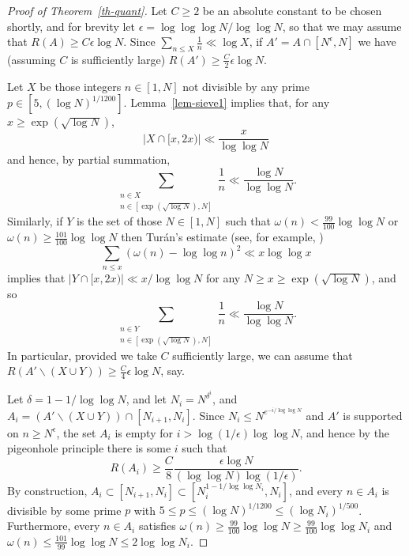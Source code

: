 \documentclass[12pt]{amsart}
\newcommand{\abs}[1]{\left\lvert #1\right\rvert}
\begin{document}
\begin{proof}[Proof of Theorem~\ref{th-quant}]
Let $C\geq 2$ be an absolute constant to be chosen shortly, and for brevity let $\epsilon = \log\log\log N/\log\log N$, so that we may assume that $R(A)\geq C\epsilon \log N$. Since $\sum_{n\leq X}\frac{1}{n}\ll \log X$, if $A'=A\cap [N^\epsilon,N]$ we have (assuming $C$ is sufficiently large) $R(A')\geq \frac{C}{2}\epsilon\log N$. 

Let $X$ be those integers $n\in [1,N]$ not divisible by any prime $p\in [5,(\log N)^{1/1200}]$. Lemma~\ref{lem-sieve1} implies that, for any $x\geq \exp(\sqrt{\log N})$,  
\[\abs{X\cap[x,2x)}\ll \frac{x}{\log\log N}\]
and hence, by partial summation, 
\[\sum_{\substack{n\in X\\ n\in [\exp(\sqrt{\log N}),N]}}\frac{1}{n}\ll \frac{\log N}{\log\log N}.\]
Similarly, if $Y$ is the set of those $N\in [1,N]$ such that $\omega(n) <\frac{99}{100}\log\log N$ or $\omega(n)\geq \frac{101}{100}\log\log N$ then Tur\'{a}n's estimate (see, for example, \cite[Theorem 2.12]{MV})
\[\sum_{n\leq x}(\omega(n)-\log\log n)^2\ll x\log\log x\]
implies that $\abs{Y\cap [x,2x)}\ll x/\log\log N$ for any $N\geq x\geq \exp(\sqrt{\log N})$, and so
\[\sum_{\substack{n\in Y\\ n\in [\exp(\sqrt{\log N}),N]}}\frac{1}{n}\ll \frac{\log N}{\log\log N}.\]
In particular, provided we take $C$ sufficiently large, we can assume that $R(A'\backslash (X\cup Y))\geq \frac{C}{4}\epsilon \log N$, say. 

Let $\delta=1-1/\log\log N$, and let $N_i=N^{\delta^i}$, and $A_i=(A'\backslash (X\cup Y))\cap [N_{i+1},N_i]$. Since $N_i\leq N^{e^{-i/\log\log N}}$ and $A'$ is supported on $n\geq N^\epsilon$, the set $A_i$ is empty for $i> \log(1/\epsilon)\log\log N$, and hence by the pigeonhole principle there is some $i$ such that
\[R(A_i)\geq \frac{C}{8}\frac{\epsilon\log N}{(\log\log N)\log(1/\epsilon)}.\]
By construction, $A_i\subset [N_{i+1},N_i]\subset [N_i^{1-1/\log\log N_i},N_i]$, and every $n\in A_i$ is divisible by some prime $p$ with $5\leq p\leq (\log N)^{1/1200}\leq (\log N_i)^{1/500}$. Furthermore, every $n\in A_i$ satisfies $\omega(n)\geq \frac{99}{100}\log\log N\geq \frac{99}{100}\log\log N_i$ and $\omega(n)\leq \frac{101}{99}\log\log N\leq 2\log\log N_i$.


\end{proof}
\end{document}

